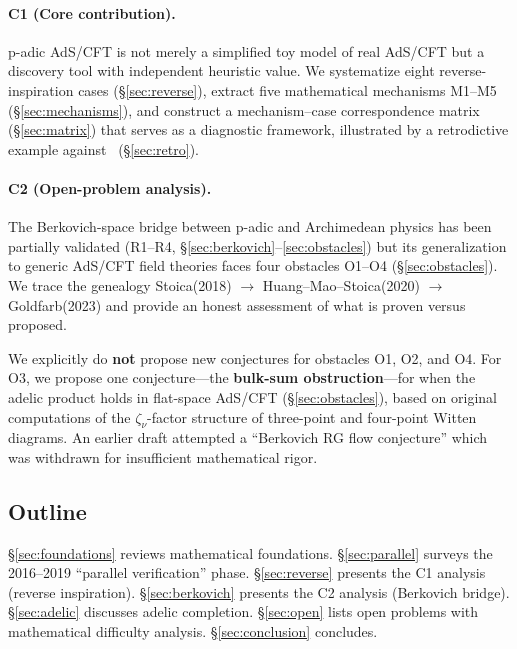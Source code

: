 \documentclass[11pt,a4paper]{article}
\begin{document}
\paragraph{C1 (Core contribution).}
p-adic AdS/CFT is not merely a simplified toy model of real AdS/CFT but a discovery tool with independent heuristic value. We systematize eight reverse-inspiration cases (\S\ref{sec:reverse}), extract five mathematical mechanisms M1--M5 (\S\ref{sec:mechanisms}), and construct a mechanism--case correspondence matrix (\S\ref{sec:matrix}) that serves as a diagnostic framework, illustrated by a retrodictive example against~\cite{HJ24} (\S\ref{sec:retro}).

\paragraph{C2 (Open-problem analysis).}
The Berkovich-space bridge between p-adic and Archimedean physics has been partially validated (R1--R4, \S\ref{sec:berkovich}--\ref{sec:obstacles}) but its generalization to generic AdS/CFT field theories faces four obstacles O1--O4 (\S\ref{sec:obstacles}). We trace the genealogy Stoica(2018) $\to$ Huang--Mao--Stoica(2020) $\to$ Goldfarb(2023) and provide an honest assessment of what is proven versus proposed.

We explicitly do \textbf{not} propose new conjectures for obstacles O1, O2, and O4. For O3, we propose one conjecture---the \textbf{bulk-sum obstruction}---for when the adelic product holds in flat-space AdS/CFT (\S\ref{sec:obstacles}), based on original computations of the $\zeta_\nu$-factor structure of three-point and four-point Witten diagrams. An earlier draft attempted a ``Berkovich RG flow conjecture'' which was withdrawn for insufficient mathematical rigor.

\subsection{Outline}

\S\ref{sec:foundations} reviews mathematical foundations. \S\ref{sec:parallel} surveys the 2016--2019 ``parallel verification'' phase. \S\ref{sec:reverse} presents the C1 analysis (reverse inspiration). \S\ref{sec:berkovich} presents the C2 analysis (Berkovich bridge). \S\ref{sec:adelic} discusses adelic completion. \S\ref{sec:open} lists open problems with mathematical difficulty analysis. \S\ref{sec:conclusion} concludes.

\end{document}
